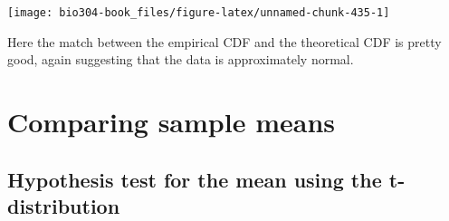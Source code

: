 \documentclass[]{book}
\newenvironment{Shaded}{\begin{snugshade}}{\end{snugshade}}
\newcommand{\CharTok}[1]{\textcolor[rgb]{0.31,0.60,0.02}{#1}}
\newcommand{\DataTypeTok}[1]{\textcolor[rgb]{0.13,0.29,0.53}{#1}}
\newcommand{\DecValTok}[1]{\textcolor[rgb]{0.00,0.00,0.81}{#1}}
\newcommand{\KeywordTok}[1]{\textcolor[rgb]{0.13,0.29,0.53}{\textbf{#1}}}
\newcommand{\NormalTok}[1]{#1}
\newcommand{\OperatorTok}[1]{\textcolor[rgb]{0.81,0.36,0.00}{\textbf{#1}}}
\newcommand{\StringTok}[1]{\textcolor[rgb]{0.31,0.60,0.02}{#1}}
\theoremstyle{definition}
\theoremstyle{definition}
\theoremstyle{definition}
\theoremstyle{remark}
\begin{document}
\begin{Shaded}
\end{Shaded}

\begin{center}\texttt{[image: bio304-book\_files/figure-latex/unnamed-chunk-435-1]} \end{center}

Here the match between the empirical CDF and the theoretical CDF is
pretty good, again suggesting that the data is approximately normal.

\hypertarget{comparing-sample-means}{%
\chapter{Comparing sample means}\label{comparing-sample-means}}

\hypertarget{hypothesis-test-for-the-mean-using-the-t-distribution}{%
\section{Hypothesis test for the mean using the
t-distribution}\label{hypothesis-test-for-the-mean-using-the-t-distribution}}
\end{document}
